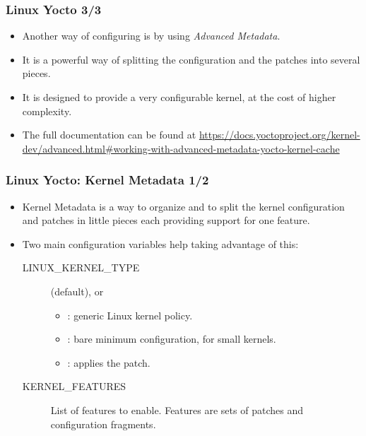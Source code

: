 \begin{frame}
  \frametitle{Linux Yocto 3/3}
  \begin{itemize}
    \item Another way of configuring  is by using
      \emph{Advanced Metadata}.
    \item It is a powerful way of splitting the configuration and the
      patches into several pieces.
    \item It is designed to provide a very configurable kernel, at the cost
      of higher complexity.
    \item The full documentation can be found at
      \url{https://docs.yoctoproject.org/kernel-dev/advanced.html\#working-with-advanced-metadata-yocto-kernel-cache}
  \end{itemize}
\end{frame}

\begin{frame}
  \frametitle{Linux Yocto: Kernel Metadata 1/2}
  \begin{itemize}
    \item Kernel Metadata is a way to organize and to split the
      kernel configuration and patches in little pieces each providing
      support for one feature.
    \item Two main configuration variables help taking advantage of
      this:
      \begin{description}
        \item[LINUX\_KERNEL\_TYPE]  (default),
           or 
          \begin{itemize}
            \item {}: generic Linux kernel policy.
            \item {}: bare minimum configuration, for small
              kernels.
            \item {}: applies the 
              patch.
          \end{itemize}
        \item[KERNEL\_FEATURES] List of features to enable. Features
          are sets of patches and configuration fragments.
      \end{description}
  \end{itemize}
\end{frame}

